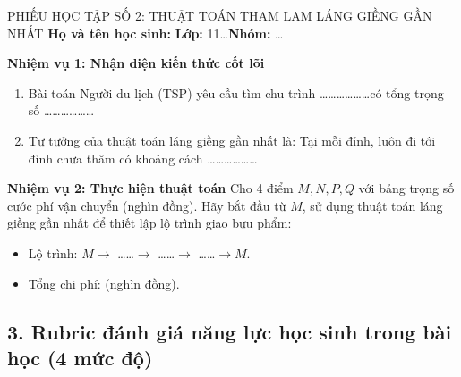\documentclass[12pt, a4paper]{article}
\begin{document}
\begin{itemize}[leftmargin=1.2cm]
\begin{pedabox}{PHIẾU HỌC TẬP SỐ 2: THUẬT TOÁN THAM LAM LÁNG GIỀNG GẦN NHẤT}
    \textbf{Họ và tên học sinh:} \dotfill \textbf{Lớp:} 11\dots \textbf{Nhóm:} \dots

    \textbf{Nhiệm vụ 1: Nhận diện kiến thức cốt lõi}
    \begin{enumerate}[leftmargin=0.6cm]
        \item Bài toán Người du lịch (TSP) yêu cầu tìm chu trình \dots\dots\dots\dots\dots\dots có tổng trọng số \dots\dots\dots\dots\dots\dots
        \item Tư tưởng của thuật toán láng giềng gần nhất là: Tại mỗi đỉnh, luôn đi tới đỉnh chưa thăm có khoảng cách \dots\dots\dots\dots\dots\dots
    \end{enumerate}

    \textbf{Nhiệm vụ 2: Thực hiện thuật toán}
    Cho 4 điểm $M, N, P, Q$ với bảng trọng số cước phí vận chuyển (nghìn đồng).
    Hãy bắt đầu từ $M$, sử dụng thuật toán láng giềng gần nhất để thiết lập lộ trình giao bưu phẩm:
    \begin{itemize}[leftmargin=0.6cm]
        \item Lộ trình: $M \to$ \dots\dots $\to$ \dots\dots $\to$ \dots\dots $\to M$.
        \item Tổng chi phí: \dotfill (nghìn đồng).
    \end{itemize}
\end{pedabox}

\subsection*{3. Rubric đánh giá năng lực học sinh trong bài học (4 mức độ)}


\end{itemize}
\end{document}
